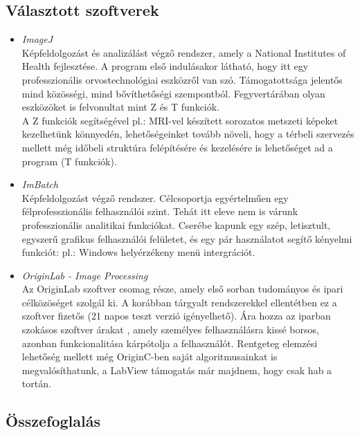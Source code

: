 \documentclass[a4paper,12pt,oneside]{report}
\begin{document}
\subsection{Választott szoftverek}
\begin{itemize}

    \item \emph{ImageJ}\cite{website:imagej}\\
    Képfeldolgozást és analizálást végző rendszer, amely a National Institutes of Health fejlesztése.
	A program első indulásakor látható, hogy itt egy professzionális orvostechnológiai eszközről van szó.
	Támogatottsága jelentős mind közösségi, mind bővíthetőségi szempontból. Fegyvertárában olyan eszközöket is felvonultat mint Z és T funkciók.\cite{article:imagej_article}\\A Z funkciók segítségével pl.: MRI-vel készített sorozatos metszeti képeket kezelhetünk könnyedén, lehetőségeinket tovább növeli, hogy a térbeli szervezés mellett még időbeli struktúra felépítésére és kezelésére is lehetőséget ad a program (T funkciók).
    
    \item \emph{ImBatch}\cite{website:imbatch}\\
    Képfeldolgozást végző rendszer. Célcsoportja egyértelműen egy félprofesszionális felhasználói szint. Tehát itt eleve nem is várunk professzionális analitikai funkciókat. Cserébe kapunk egy szép, letisztult, egyszerű grafikus felhasználói felületet, és egy pár használatot segítő kényelmi funkciót: pl.: Windows helyérzékeny menü intergrációt.
    
    \item \emph{OriginLab - Image Processing}\cite{website:originlab}\\
	Az OriginLab szoftver csomag része, amely első sorban tudományos és ipari célközöséget szolgál ki. \cite{website:originlab_about} A korábban tárgyalt rendszerekkel ellentétben ez a szoftver fizetős (21 napos teszt verzió igényelhető). Ára hozza az iparban szokásos szoftver árakat \cite{website:originlab_usd}, amely személyes felhasználásra kissé borsos, azonban funkcionalitása kárpótolja a felhasználót. Rentgeteg elemzési lehetőség mellett még OriginC-ben saját algoritmusainkat is megvalósíthatunk, a LabView támogatás már majdnem, hogy csak hab a tortán.\\
\end{itemize}
	

\subsection{Összefoglalás}
\end{document}
